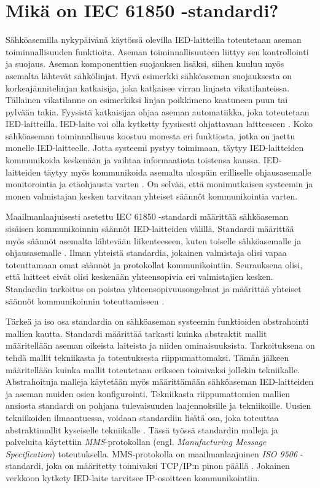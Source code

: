 \chapter{Mikä on IEC 61850 -standardi?}
\label{ch:iec61850-theory}
Sähköasemilla nykypäivänä käytössä olevilla IED-laitteilla toteutetaan aseman toiminnallisuuden funktioita. Aseman toiminnallisuuteen liittyy sen kontrollointi ja suojaus. Aseman komponenttien suojauksen lisäksi, siihen kuuluu myös asemalta lähtevät sähkölinjat. Hyvä esimerkki sähköaseman suojauksesta on korkeajännitelinjan katkaisija, joka katkaisee virran linjasta vikatilanteissa. Tällainen vikatilanne on esimerkiksi linjan poikkimeno kaatuneen puun tai pylvään takia. Fyysistä katkaisijaa ohjaa aseman automatiikka, joka toteutetaan IED-laitteilla. IED-laite voi olla kytketty fyysisesti ohjattavaan laitteeseen \mbox{\cite[s.~63--64]{IEC61850-7-1}}. Koko sähköaseman toiminnallisuus koostuu monesta eri funktiosta, jotka on jaettu monelle IED-laitteelle. Jotta systeemi pystyy toimimaan, täytyy IED-laitteiden kommunikoida keskenään ja vaihtaa informaatiota toistensa kanssa. IED-laitteiden täytyy myös kommunikoida asemalta ulospäin erilliselle ohjausasemalle monitorointia ja etäohjausta varten \mbox{\cite[s.~1]{Brunner2008}}. On selvää, että monimutkaisen systeemin ja monen valmistajan kesken tarvitaan yhteiset säännöt kommunikointia varten.

Maailmanlaajuisesti asetettu IEC 61850 -standardi määrittää sähköaseman sisäisen kommunikoinnin säännöt IED-laitteiden välillä. Standardi määrittää myös säännöt asemalta lähtevään liikenteeseen, kuten toiselle sähköasemalle ja ohjausasemalle \mbox{\cite[s.~10]{IEC61850-7-1}}. Ilman yhteistä standardia, jokainen valmistaja olisi vapaa toteuttamaan omat säännöt ja protokollat kommunikointiin. Seurauksena olisi, että laitteet eivät olisi keskenään yhteensopivia eri valmistajien kesken. Standardin tarkoitus on poistaa yhteensopivuusongelmat ja määrittää yhteiset säännöt kommunikoinnin toteuttamiseen \mbox{\cite[s.~1]{Kaneda2008}}.

Tärkeä ja iso osa standardia on sähköaseman systeemin funktioiden abstrahointi mallien kautta. Standardi määrittää tarkasti kuinka abstraktit mallit määritellään aseman oikeista laiteista ja niiden ominaisuuksista. Tarkoituksena on tehdä mallit tekniikasta ja toteutuksesta riippumattomaksi. Tämän jälkeen määritellään kuinka mallit toteutetaan erikseen toimivaksi jollekin tekniikalle. Abstrahoituja malleja käytetään myös määrittämään sähköaseman IED-laitteiden ja aseman muiden osien konfigurointi. Tekniikasta riippumattomien mallien ansiosta standardi on pohjana tulevaisuuden laajennoksille ja tekniikoille. Uusien tekniikoiden ilmaantuessa, voidaan standardiin lisätä  osa, joka  toteuttaa abstraktimallit kyseiselle tekniikalle \mbox{\cite[s.~2]{Brunner2008}}. Tässä työssä standardin malleja ja palveluita käytettiin \emph{MMS}-protokollan (engl. \emph{Manufacturing Message Specification}) toteutuksella. MMS-protokolla on maailmanlaajuinen \emph{ISO 9506} -standardi, joka on määritetty toimivaksi TCP/IP:n pinon päällä \mbox{\cite{MMS-protocol-stack-and-API}}. Jokainen verkkoon kytkety IED-laite tarvitsee IP-osoitteen kommunikointiin.


